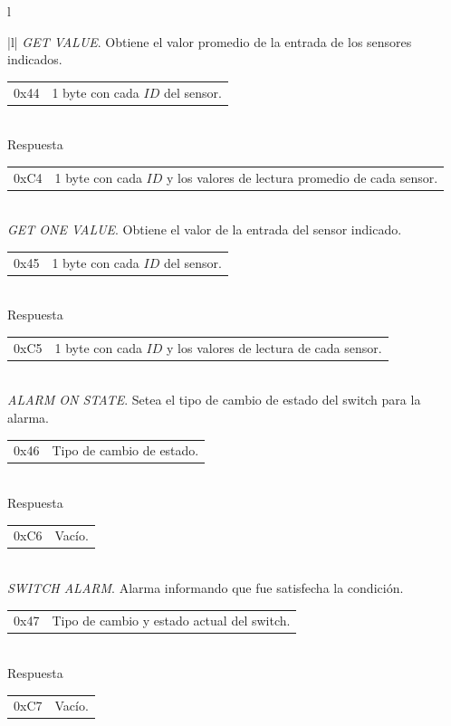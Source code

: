 \begin{table}
\begin{center}
\begin{tabular}{l}
\begin{tabular}{|l|}
				\hline\hline
				\emph{GET VALUE}. Obtiene el valor promedio de la entrada de los sensores indicados. \\
				\hline
				\begin{tabular}{c|l}
					0x44 & 1 byte con cada $ID$ del sensor. \\
				\end{tabular}
				\\
				\hline
				Respuesta \\
				\hline
				\begin{tabular}{c|l}
					0xC4 & 1 byte con cada $ID$ y los valores de lectura promedio de cada sensor. \\
				\end{tabular}
				\\
	
				\hline\hline
				\emph{GET ONE VALUE}. Obtiene el valor de la entrada del sensor indicado. \\
				\hline
				\begin{tabular}{c|l}
					0x45 & 1 byte con cada $ID$ del sensor. \\
				\end{tabular}
				\\
				\hline
				Respuesta \\
				\hline
				\begin{tabular}{c|l}
					0xC5 & 1 byte con cada $ID$ y los valores de lectura de cada sensor. \\
				\end{tabular}
				\\
	
				\hline\hline
				\emph{ALARM ON STATE}. Setea el tipo de cambio de estado del switch para la alarma. \\
				\hline
				\begin{tabular}{c|l}
					0x46 & Tipo de cambio de estado.\\
				\end{tabular}
				\\
				\hline
				Respuesta \\
				\hline
				\begin{tabular}{c|l}
					0xC6 & Vac\'io. \\
				\end{tabular}
				\\
	
				\hline\hline
				\emph{SWITCH ALARM}. Alarma informando que fue satisfecha la condici\'on. \\
				\hline
				\begin{tabular}{c|l}
					0x47 & Tipo de cambio y estado actual del switch.\\
				\end{tabular}
				\\
				\hline
				Respuesta \\
				\hline
				\begin{tabular}{c|l}
					0xC7 & Vac\'io. \\
				\end{tabular}
				\\
	

\end{tabular}
\end{tabular}
\end{center}
\end{table}
